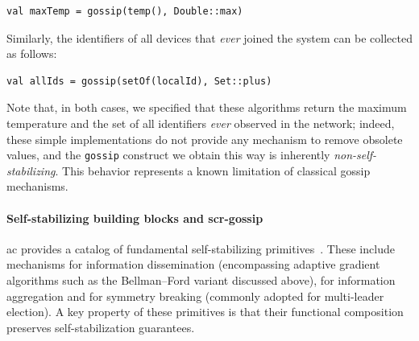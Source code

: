 \documentclass[runningheads]{llncs}
\begin{document}
\vspace{5pt}
\begin{minipage}{.95\columnwidth}
    \begin{lstlisting}
val maxTemp = gossip(temp(), Double::max)
    \end{lstlisting}
\end{minipage}

Similarly, the identifiers of all devices that \emph{ever} joined the system can be collected as follows:

\vspace{5pt}
\begin{minipage}{.95\columnwidth}
    \begin{lstlisting}
val allIds = gossip(setOf(localId), Set::plus)
    \end{lstlisting}
\end{minipage}

Note that, in both cases, we specified that these algorithms return
the maximum temperature and the set of all identifiers \emph{ever} observed in the network;
indeed, these simple implementations do not provide any mechanism to remove obsolete values,
and the \lstinline|gossip| construct we obtain this way is inherently \emph{non-self-stabilizing}.
%
This behavior represents a known limitation of classical gossip mechanisms.

\paragraph{Self-stabilizing building blocks and \ac{scr}-gossip}
\ac{ac} provides a catalog of fundamental self-stabilizing primitives~\cite{DBLP:journals/tomacs/ViroliABDP18}.
%
These include mechanisms for information dissemination
(encompassing adaptive gradient algorithms such as the Bellman--Ford variant discussed above),
for information aggregation
and for symmetry breaking
(commonly adopted for multi-leader election).
%
A key property of these primitives is that their functional composition
preserves self-stabilization guarantees.
\end{document}

